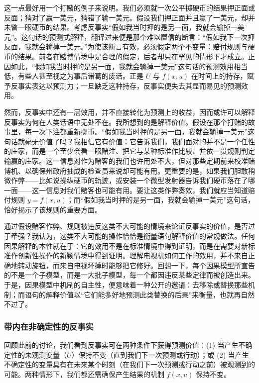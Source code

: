 这一点最好用一个打赌的例子来说明。我们必须就一次公平掷硬币的结果押正面或反面；猜对了赢一美元，猜错了输一美元。假设我们押正面并且赢了一美元，却并未瞥一眼硬币的结果。考虑反事实“假如我当时押的是另一面，我就会输掉一美元”。这句话的预测式解释，翻译过来便是那个难以置信的断言：“假如我下一次押反面，我就会输掉一美元。”为使该断言有效，必须假定两个不变量：赔付规则与硬币的结果。前者在赌博情境中是合理的假定，后者却只在罕见的情形下才成立。正因如此，“假如我当时押的是另一面，我就会输掉一美元”这句话的预测效用相当低，有些人甚至视之为事后诸葛的废话。正是 $U$ 与 $f(x,u)$ 在时间上的持存，赋予反事实表达以预测力；一旦缺乏这种持存，反事实便失去其显而易见的预测效用。

然而，反事实中还有一层效用，并不直接转化为预测上的收益，因而或许可以解释反事实为何在人类话语中无处不在。我所想到的是解释价值。假设在那个打赌的故事里，每一次下注都重新掷币。“假如我当时押的是另一面，我就会输掉一美元”这句话就毫无价值了吗？我相信它有价值：它告诉我们，我们面对的并不是一个任性的庄家，而是一个至少会看一眼赌注、把它与某种标准作比较、并依一贯规则判定输赢的庄家。这一信息对作为赌客的我们也许用处不大，但对那些定期前来校准赌博机、以确保州政府抽成的检查员来说却可能有用。更重要的是，如果我们胆敢稍微作弊——比如说操纵硬币的轨迹，或安装一个微型发射器告诉我们硬币落在了哪一面——这一信息对我们赌客也可能有用。要让这类作弊奏效，我们就应当知道赔付规则 $y=f(x,u)$；而“假如我当时押的是另一面，我就会输掉一美元”这句话，恰好揭示了该规则的重要方面。

通过假设赌客作弊、规则被违反这类不大可能的情境来论证反事实的价值，是否过于牵强？我认为，这类不大可能的操作恰恰是衡量语句解释价值的常规做法。任何因果解释的本性就在于：它的效用不是在标准情境中得到证明，而是在需要对新标准作创新性操作的新颖情境中得到证明。理解电视机如何工作的效用，并不来自正确地转动旋钮，而来自电视坏掉时能够把它修好。回想一下，每个因果模型所宣告的不是一个子模型，而是一大批子模型，每一个都因违反某些定律而被创造出来。于是，因果模型中机制的自主性，便意味着一种公开的邀请：去移除或替换那些机制；而语句的解释价值以“它们能多好地预测此类替换的后果”来衡量，也就再自然不过了。

\subsubsection*{带内在非确定性的反事实}

回顾此前的讨论，我们看到反事实可在两种条件下获得预测价值：(1) 当产生不确定性的未观测变量（$U$）保持不变（直到我们下一次预测或行动）；或 (2) 当产生不确定性的变量具有在未来某个时刻（在我们下一次预测或行动之前）被观测到的可能。两种情形下，我们都还需确保产生结果的机制 $f(x,u)$ 保持不变。


